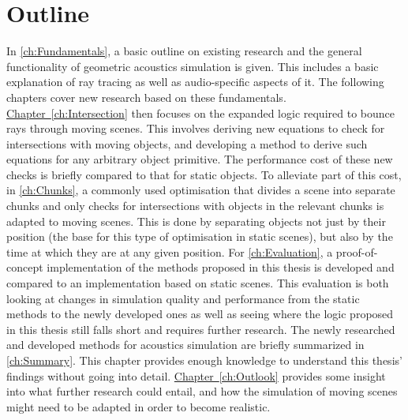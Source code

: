 \section{Outline}

In \autoref{ch:Fundamentals}, a basic outline on existing research and the general functionality of geometric acoustics simulation is given.
This includes a basic explanation of ray tracing as well as audio-specific aspects of it.
The following chapters cover new research based on these fundamentals.
\newline
\hyperref[ch:Intersection]{Chapter~\ref*{ch:Intersection}} then focuses on the expanded logic required to bounce rays through moving scenes.
This involves deriving new equations to check for intersections with moving objects,
and developing a method to derive such equations for any arbitrary object primitive.
The performance cost of these new checks is briefly compared to that for static objects.
\newline
To alleviate part of this cost, in \autoref{ch:Chunks},
a commonly used optimisation that divides a scene into separate chunks
and only checks for intersections with objects in the relevant chunks is adapted to moving scenes.
This is done by separating objects not just by their position (the base for this type of optimisation in static scenes),
but also by the time at which they are at any given position.
\newline
For \autoref{ch:Evaluation}, a proof-of-concept implementation of the methods proposed in this thesis is developed
and compared to an implementation based on static scenes.
This evaluation is both looking at changes in simulation quality and performance from the static methods to the newly developed ones
as well as seeing where the logic proposed in this thesis still falls short and requires further research.
\newline
The newly researched and developed methods for acoustics simulation are briefly summarized in \autoref{ch:Summary}.
This chapter provides enough knowledge to understand this thesis' findings without going into detail.
\newline
\hyperref[ch:Outlook]{Chapter~\ref*{ch:Outlook}} provides some insight into what further research could entail,
and how the simulation of moving scenes might need to be adapted in order to become realistic.
